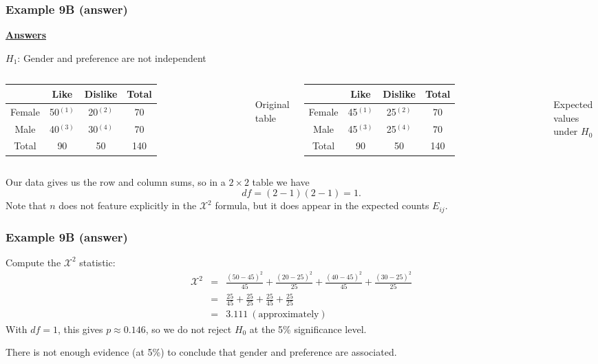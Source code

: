 \documentclass[t,8pt]{beamer}
\begin{document}
\begin{frame}
	\frametitle{Example 9B (answer)}
	{\bf\underline{Answers}} \par
	$H_1$: Gender and preference are not independent \par
	\begin{columns}
		\centering
		\begin{tabular}{ c | c  c | c }
			& Like & Dislike & Total \\ \hline
			Female & 50$^{(1)}$ & 20$^{(2)}$ & 70 \\ 
			Male & 40$^{(3)}$ & 30$^{(4)}$ & 70 \\ \hline
			Total & 90 & 50 & 140
		\end{tabular}\\[3pt]
		Original table
		\centering
		\begin{tabular}{ c | c  c | c }
			& Like & Dislike & Total \\ \hline
			Female & 45$^{(1)}$ & 25$^{(2)}$ & 70 \\ 
			Male & 45$^{(3)}$ & 25$^{(4)}$ & 70 \\ \hline
			Total & 90 & 50 & 140
		\end{tabular}\\[3pt]
		Expected values under $H_0$
	\end{columns}
	Our data gives us the row and column sums, so in a $2\times 2$ table we have
	\[
	df=(2-1)(2-1)=1.
	\]
	Note that $n$ does not feature explicitly in the $\mathcal{X}^2$ formula, but it does appear in the expected counts $E_{ij}$.
\end{frame}

\begin{frame}
	\frametitle{Example 9B (answer)}
	Compute the $\mathcal{X}^2$ statistic:
	\begin{eqnarray*}
		\mathcal{X}^2&=&\frac{(50-45)^2}{45}+\frac{(20-25)^2}{25}+\frac{(40-45)^2}{45}+\frac{(30-25)^2}{25}\\
		&=&\frac{25}{45}+\frac{25}{25}+\frac{25}{45}+\frac{25}{25}\\
		&=&3.111\ (\text{approximately})
	\end{eqnarray*}
	With $df=1$, this gives $p\approx 0.146$, so we do not reject $H_0$ at the 5\% significance level. \par
	There is not enough evidence (at 5\%) to conclude that gender and preference are associated.
\end{frame}
\end{document}
